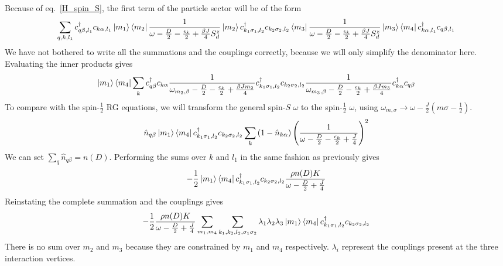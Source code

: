 \documentclass[12pt]{revtex4-2}
\begin{document}
Because of eq.~\ref{H_spin_S}, the first term of the particle sector will be of the form
\begin{equation}\begin{aligned}
	\sum_{q,k,l_1} c^\dagger_{q\beta, l_1}c_{k \alpha, l_1}\ket{m_1}\bra{m_2} \frac{1}{\omega - \frac{D}{2} - \frac{\epsilon_k}{2} + \frac{\beta J}{4}S_d^z} \ket{m_2} c^\dagger_{k_1 \sigma_1, l_2}c_{k_2 \sigma_2,l_2} \bra{m_3}\frac{1}{\omega - \frac{D}{2} - \frac{\epsilon_k}{2} + \frac{\beta J}{4}S_d^z}\ket{m_3}\bra{m_4}c^\dagger_{k\alpha, l_1}c_{q\beta, l_1}
\end{aligned}\end{equation}
We have not bothered to write all the summations and the couplings correctly, because we will only simplify the denominator here. Evaluating the inner products gives
\begin{equation}\begin{aligned}
	\ket{m_1}\bra{m_4}\sum_k c^\dagger_{q\beta}c_{k \alpha} \frac{1}{\omega_{m_2,\beta} - \frac{D}{2} - \frac{\epsilon_k}{2} + \frac{\beta J m_2}{4}}  c^\dagger_{k_1 \sigma_1, l_2}c_{k_2 \sigma_2,l_2} \frac{1}{\omega_{m_3,\beta} - \frac{D}{2} - \frac{\epsilon_k}{2} + \frac{\beta J m_3}{4}}c^\dagger_{k\alpha}c_{q\beta}
\end{aligned}\end{equation}
To compare with the spin-\(\frac{1}{2}\) RG equations, we will transform the general spin-\(S\) \(\omega\) to the spin-\(\frac{1}{2}\) \( \omega\), using \(\omega_{m,\sigma} \to \omega - \frac{J}{2}\left(m\sigma - \frac{1}{2}\right)\).
\begin{equation}\begin{aligned}
	\hat n_{q\beta}\ket{m_1}\bra{m_4}c^\dagger_{k_1 \sigma_1, l_2}c_{k_2 \sigma_2,l_2}\sum_k \left( 1 - \hat n_{k\alpha} \right) \left(\frac{1}{\omega - \frac{D}{2} - \frac{\epsilon_k}{2} + \frac{J}{4}}\right)^2  
\end{aligned}\end{equation}
We can set \(\sum_q \hat n_{q\beta} = n(D)\). Performing the sums over \(k\) and \(l_1\) in the same fashion as previously gives
\begin{equation}\begin{aligned}
	-\frac{1}{2}\ket{m_1}\bra{m_4}c^\dagger_{k_1 \sigma_1, l_2}c_{k_2 \sigma_2,l_2} \frac{\rho n(D) K}{\omega - \frac{D}{2} + \frac{J}{4}}
\end{aligned}\end{equation}
Reinstating the complete summation and the couplings gives
\begin{equation}\begin{aligned}
	-\frac{1}{2}\frac{\rho n(D) K}{\omega - \frac{D}{2} + \frac{J}{4}}\sum_{m_1,m_4}\sum_{k_1,k_2,l_2,\sigma_1\sigma_2}\lambda_{1}\lambda_{2}\lambda_{3}\ket{m_1}\bra{m_4}c^\dagger_{k_1 \sigma_1, l_2}c_{k_2 \sigma_2,l_2}
\end{aligned}\end{equation}
There is no sum over \(m_2\) and \(m_3\) because they are constrained by \(m_1\) and \(m_4\) respectively. \(\lambda_i\) represent the couplings present at the three interaction vertices.
\end{document}
